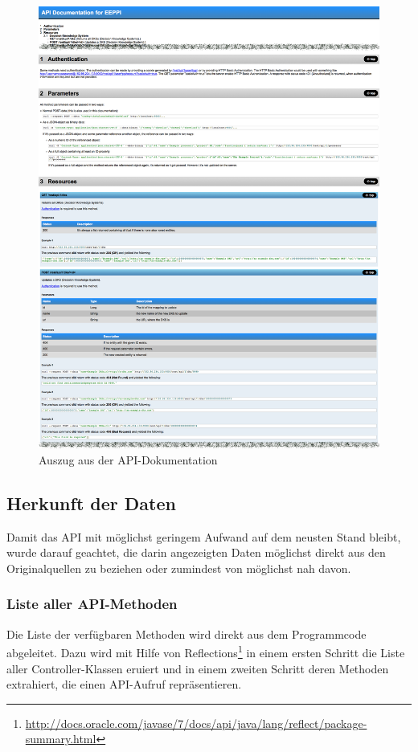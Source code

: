 	\begin{figure}[H]
		\includegraphics[width=\textwidth]{interfacesAndProtocols/media/img/apiDocumentation.png}
		\centering
		\caption{Auszug aus der API-Dokumentation}
		\label{fig:apiScreenshot}
	\end{figure}

	\subsection{Herkunft der Daten}
		Damit das API mit möglichst geringem Aufwand auf dem neusten Stand bleibt, wurde darauf geachtet,
		die darin angezeigten Daten möglichst direkt aus den Originalquellen zu beziehen oder zumindest von möglichst nah davon.
		\subsubsection{Liste aller API-Methoden}
			Die Liste der verfügbaren Methoden wird direkt aus dem Programmcode abgeleitet.
			Dazu wird mit Hilfe von Reflections\footnote{\url{http://docs.oracle.com/javase/7/docs/api/java/lang/reflect/package-summary.html}} in einem ersten Schritt die Liste aller Controller-Klassen eruiert
			und in einem zweiten Schritt deren Methoden extrahiert, die einen API-Aufruf repräsentieren.
		
